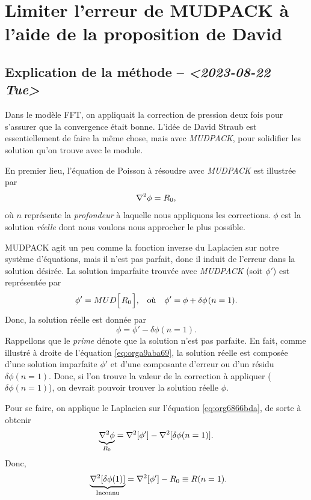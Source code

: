 \documentclass[10pt]{article}
\numberwithin{equation}{section}
\newcommand{\tall}{\vphantom{pA^{x^x}_p}}
\newcommand{\pt}{\hspace{1pt}} %
\begin{document}
\section{Limiter l'erreur de MUDPACK à l'aide de la proposition de David}
\label{sec:org772c9c9}

\subsection{Explication de la méthode -- \textit{<2023-08-22 Tue>}}
\label{sec:orgcc3b110}
\label{org9b951a1}

Dans le modèle FFT, on appliquait la correction de pression deux fois pour s'assurer que la convergence était bonne.
L'idée de David Straub est essentiellement de faire la même chose, mais avec \emph{MUDPACK}, pour solidifier les solution qu'on trouve avec le module. \bigskip

En premier lieu, l'équation de Poisson à résoudre avec \emph{MUDPACK} est illustrée par
\begin{equation}
   \laplacian{\phi} = R_0,
\end{equation}
où \(n\) représente la \emph{profondeur} à laquelle nous appliquons les corrections.
\(\phi\) est la solution \emph{réelle} dont nous voulons nous approcher le plus possible.\bigskip

MUDPACK agit un peu comme la fonction inverse du Laplacien sur notre système d'équations, mais il n'est pas parfait, donc il induit de l'erreur dans la solution désirée.
La solution imparfaite trouvée avec \emph{MUDPACK} (soit \(\phi'\)) est représentée par 
\begin{align}
\label{eq:orga9aba69}
   && \phi' = MUD\qty[\pt R_0\pt\tall ], && \text{où} && \phi' = \phi + \delta\phi\pt(n=1).&&
\end{align}
Donc, la solution réelle est donnée par
\begin{equation}
\label{eq:org6866bda}
   \phi = \phi' - \delta\phi(n=1).
\end{equation}
Rappellons que le \emph{prime} dénote que la solution n'est pas parfaite. En fait, comme illustré à droite de l'équation \ref{eq:orga9aba69}, la solution réelle est composée d'une solution imparfaite \(\phi'\) et d'une composante d'erreur ou d'un résidu \(\delta \phi(n=1)\).
Donc, si l'on trouve la valeur de la correction à appliquer (\(\delta\phi(n=1)\)), on devrait pouvoir trouver la solution réelle \(\phi\).\bigskip

Pour se faire, on applique le Laplacien sur l'équation \ref{eq:org6866bda}, de sorte à obtenir
\begin{equation}
   \underbrace{\laplacian{\phi}}_{R_0} = \laplacian[\phi'] - \laplacian[\delta\phi(n=1)].
\end{equation}
Donc,
\begin{equation}
   \hspace{2mm} \underbrace{\laplacian[\delta\phi(1)]}_\text{Inconnu} = \laplacian[\phi'] - R_0 \equiv R(n=1).
\end{equation}
\end{document}
